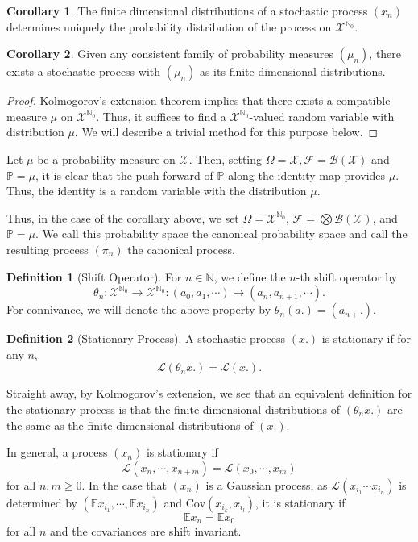 \documentclass[]{article}
\theoremstyle{definition}
\newtheorem{corollary}{Corollary}[theorem]
\theoremstyle{definition}
\newtheorem{definition}{Definition}[section]
\begin{document}
\begin{corollary}
  The finite dimensional distributions of a stochastic process \((x_n)\) determines 
  uniquely the probability distribution of the process on \(\mathcal{X}^{\mathbb{N}_0}\).
\end{corollary}

\begin{corollary}
  Given any consistent family of probability measures \((\mu_n)\), there exists a 
  stochastic process with \((\mu_n)\) as its finite dimensional distributions.
\end{corollary}
\begin{proof}
  Kolmogorov's extension theorem implies that there exists a compatible measure 
  \(\mu\) on \(\mathcal{X}^{\mathbb{N}_0}\). Thus, it suffices to find 
  a \(\mathcal{X}^{\mathbb{N}_0}\)-valued random variable with distribution 
  \(\mu\). We will describe a trivial method for this purpose below.
\end{proof}

Let \(\mu\) be a probability measure on \(\mathcal{X}\). Then, setting 
\(\Omega = \mathcal{X}, \mathcal{F} = \mathcal{B}(\mathcal{X})\) and \(\mathbb{P} = \mu\),
it is clear that the push-forward of \(\mathbb{P}\) along the identity map 
provides \(\mu\). Thus, the identity is a random variable with the distribution 
\(\mu\).

Thus, in the case of the corollary above, we set \(\Omega = \mathcal{X}^{\mathbb{N}_0}\),
\(\mathcal{F} = \bigotimes\mathcal{B}(\mathcal{X})\), and \(\mathbb{P} = \mu\). 
We call this probability space the canonical probability space and call the 
resulting process \((\pi_n)\) the canonical process.

\begin{definition}[Shift Operator]
  For \(n \in \mathbb{N}\), we define the \(n\)-th shift operator by 
  \[\theta_n : \mathcal{X}^{\mathbb{N}_0} \to \mathcal{X}^{\mathbb{N}_0} : 
    (a_0, a_1, \cdots) \mapsto (a_n, a_{n + 1}, \cdots).\]
  For connivance, we will denote the above property by \(\theta_n(a.) = (a_{n +}.)\). 
\end{definition}

\begin{definition}[Stationary Process]
  A stochastic process \((x.)\) is stationary if for any \(n\), 
  \[\mathcal{L}(\theta_n x.) = \mathcal{L}(x.).\]
\end{definition}

Straight away, by Kolmogorov's extension, we see that an equivalent definition 
for the stationary process is that the finite dimensional distributions 
of \((\theta_n x.)\) are the same as the finite dimensional distributions of \((x.)\).

In general, a process \((x_n)\) is stationary if 
\[\mathcal{L}(x_n, \cdots, x_{n + m}) = \mathcal{L}(x_0, \cdots, x_m)\]
for all \(n, m \ge 0\). In the case that \((x_n)\) is a Gaussian process, 
as \(\mathcal{L}(x_{i_1} \cdots x_{i_n})\) is determined by 
\((\mathbb{E}x_{i_1}, \cdots, \mathbb{E}x_{i_n})\) and \(\text{Cov}(x_{i_k}, x_{i_l})\),
it is stationary if 
\[\mathbb{E}x_n = \mathbb{E}x_0\]
for all \(n\) and the covariances are shift invariant.
\end{document}
